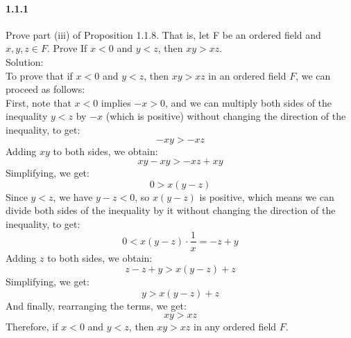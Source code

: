 \documentclass{article}
\begin{document}
\paragraph{1.1.1}
Prove part (iii) of Proposition 1.1.8. That is, let F be an ordered field and $x, y,z \in F$. Prove
If $x < 0$ and $y < z$, then $xy > xz$.\\
Solution:\\
To prove that if $x < 0$ and $y < z$, then $xy > xz$ in an ordered field $F$, we can proceed as follows:\\
First, note that $x<0$ implies $-x>0$, and we can multiply both sides of the inequality $y<z$ by $-x$ (which is positive) without changing the direction of the inequality, to get:
$$-xy > -xz$$
Adding $xy$ to both sides, we obtain:
$$xy-xy>-xz+xy$$
Simplifying, we get:
$$0>x(y-z)$$
Since $y<z$, we have $y-z<0$, so $x(y-z)$ is positive, which means we can divide both sides of the inequality by it without changing the direction of the inequality, to get:
$$0<x(y-z)\cdot\frac{1}{x}=-z+y$$
Adding $z$ to both sides, we obtain:
$$z-z+y>x(y-z)+z$$
Simplifying, we get:
$$y>x(y-z)+z$$
And finally, rearranging the terms, we get:
$$xy>xz$$
Therefore, if $x<0$ and $y<z$, then $xy>xz$ in any ordered field $F$.
\end{document}

